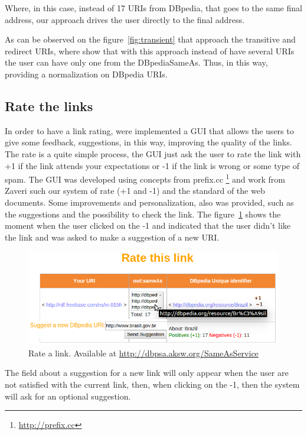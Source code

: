 Where, in this case, instead of 17 URIs from DBpedia, that goes to the same final address, our approach drives the user directly to the final address.

As can be observed on the figure~\ref{fig:transient} that approach the transitive and redirect URIs, where show that with this approach instead of have several URIs the user can have only one from the DBpediaSameAs. Thus, in this way, providing a normalization on DBpedia URIs.

\subsection{Rate the links}

In order to have a link rating, were implemented a GUI that allows the users to give some feedback, suggestions, in this way, improving the quality of the links.
The rate is a quite simple process, the GUI just ask the user to rate the link with +1 if the link attends your expectations or -1 if the link is wrong or some type of spam.
The GUI was developed using concepts from prefix.cc \footnote{\url{http://prefix.cc}} and work from Zaveri\cite{anra2013} such our system of rate (+1 and -1) and the standard of the web documents. Some improvements and personalization, also was provided, such as the suggestions and the possibility to check the link. The figure~\ref{fig:rate} shows the moment when the user clicked on the -1 and  indicated that the user didn't like the link and was asked to make a suggestion of a new URI.

\begin{figure}[hbt] 
  	\centering
	\includegraphics[width=\columnwidth]{img/rate2.png}
  	\caption{Rate a link. Available at \url{http://dbpsa.aksw.org/SameAsService}}
  	\label{fig:rate}
\end{figure}

The field about a suggestion for a new link will only appear when the user are not satisfied with the current link, then, when clicking on the -1, then the system will ask for an optional suggestion.

